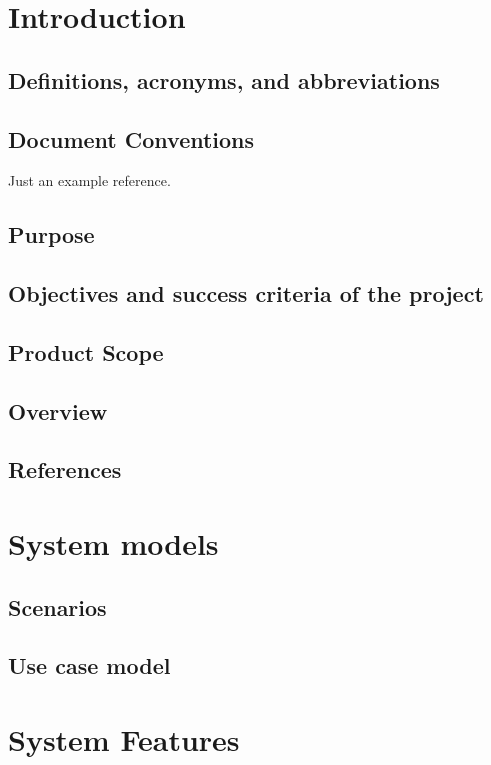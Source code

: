 \chapter{Introduction}
\label{ch:intro}

\section{Definitions, acronyms, and abbreviations}
\section{Document Conventions}

Just an example reference. \cite{nom1999norma,teich2008technology}
\section{Purpose}
\section{Objectives and success criteria of the project}
\section{Product Scope}
\section{Overview}
\section{References}

\newpage

\chapter{System models}
\label{External Interface Requirements}

\section{Scenarios}
\section{Use case model}

\chapter{System Features}
\label{System Features}

